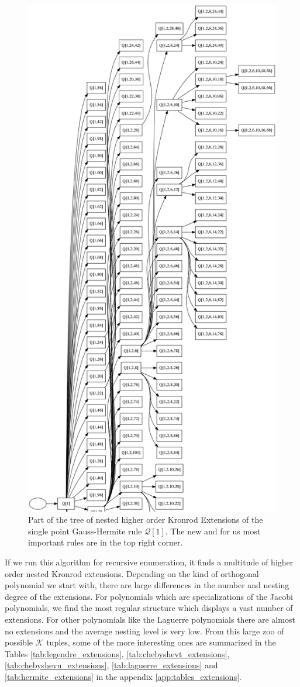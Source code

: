 \documentclass[a4paper,10pt]{article}
\begin{document}
\begin{figure}
  \centering
  \includegraphics[width=0.8\linewidth]{./img/graph_hermite_1_100_6_part.png}
  \caption{Part of the tree of nested higher order Kronrod Extensions of the
  single point Gauss-Hermite rule $\mathcal{Q}[1]$.
  The new and for us most important rules are in the top right corner.}
  \label{fig:graph_1_100_6_part}
\end{figure}

If we run this algorithm for recursive enumeration, it finds a multitude
of higher order nested Kronrod extensions. Depending on the kind of orthogonal
polynomial we start with, there are large differences in the number and nesting
degree of the extensions. For polynomials which are specializations of the
Jacobi polynomials, we find the most regular structure which displays a vast number
of extensions. For other polynomials like the Laguerre polynomials there are almost
no extensions and the average nesting level is very low. From this large zoo of
possible $\mathcal{K}$ tuples, some of the more interesting ones are summarized
in the Tables \ref{tab:legendre_extensions}, \ref{tab:chebyshevt_extensions},
\ref{tab:chebyshevu_extensions}, \ref{tab:laguerre_extensions} and \ref{tab:hermite_extensions}
in the appendix \ref{app:tables_extensions}.
\end{document}
